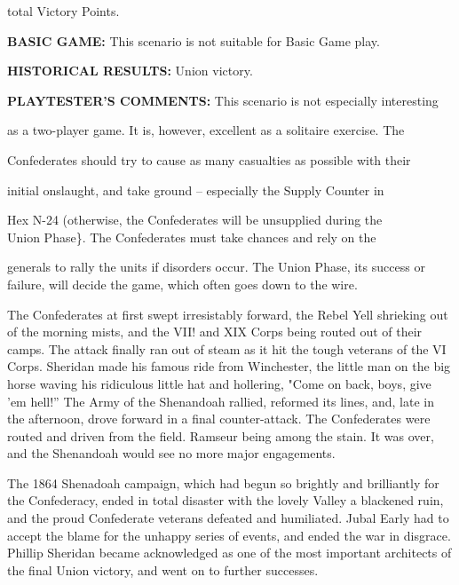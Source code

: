 total Victory Points.

\begin{scenariodata}
\textbf{BASIC GAME:} This scenario is not suitable for Basic Game play.\\
\end{scenariodata}

\begin{scenariodata}
\textbf{HISTORICAL RESULTS:} Union victory.\\
\end{scenariodata}

\begin{scenariodata}
\textbf{PLAYTESTER'S COMMENTS:} This scenario is not especially interesting\\
\end{scenariodata}

as a two-player game. It is, however, excellent as a solitaire exercise. The

\begin{scenariodata}
Confederates should try to cause as many casualties as possible with their\\
\end{scenariodata}

initial onslaught, and take ground -- especially the Supply Counter in

\begin{scenariodata}
Hex N-24 (otherwise, the Confederates will be unsupplied during the\\
Union Phase\}. The Confederates must take chances and rely on the\\
\end{scenariodata}

generals to rally the units if disorders occur. The Union Phase, its success or failure, will decide the game, which often goes down to the wire.

The Confederates at first swept irresistably forward, the Rebel Yell shrieking out of the morning mists, and the VII! and XIX Corps being routed out of their camps. The attack finally ran out of steam as it hit the tough veterans of the VI Corps. Sheridan made his famous ride from Winchester, the little man on the big horse waving his ridiculous little hat and hollering, "Come on back, boys, give 'em hell!'' The Army of the Shenandoah rallied, reformed its lines, and, late in the afternoon, drove forward in a final counter-attack. The Confederates were routed and driven from the field. Ramseur being among the stain. It was over, and the Shenandoah would see no more major engagements.

The 1864 Shenadoah campaign, which had begun so brightly and brilliantly for the Confederacy, ended in total disaster with the lovely Valley a blackened ruin, and the proud Confederate veterans defeated and humiliated. Jubal Early had to accept the blame for the unhappy series of events, and ended the war in disgrace. Phillip Sheridan became acknowledged as one of the most important architects of the final Union victory, and went on to further successes.

